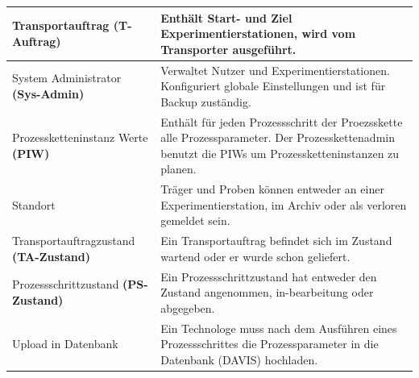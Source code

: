 \documentclass[enabledeprecatedfontcommands,fontsize=12pt,paper=a4,twoside]{scrartcl}
\begin{document}
\begin{longtable}[c]{|p{7cm}|p{8cm}|}
Transportauftrag \textbf{(T-Auftrag)}          & Enthält Start- und Ziel Experimentierstationen, wird vom Transporter ausgeführt.                                                                                                                                                                      \\ \hline
System Administrator \textbf{(Sys-Admin)}      & Verwaltet Nutzer und Experimentierstationen. Konfiguriert globale Einstellungen und ist für Backup zuständig.                                                                                                                                         \\ \hline
Prozessketteninstanz Werte \textbf{(PIW)}      & Enthält für jeden Prozessschritt der Proezsskette alle Prozessparameter. Der Prozesskettenadmin benutzt die PIWs um Prozessketteninstanzen zu planen.                                                                                                 \\ \hline
Standort                                                        & Träger und Proben können entweder an einer Experimentierstation, im Archiv oder als verloren gemeldet sein.                                                                                                                                           \\ \hline
Transportauftragzustand \textbf{(TA-Zustand)}  & Ein Transportauftrag befindet sich im Zustand wartend oder er wurde schon geliefert.                                                                                                                                                                  \\ \hline
Prozessschrittzustand \textbf{(PS-Zustand)}    & Ein Prozessschrittzustand hat entweder den Zustand angenommen, in-bearbeitung oder abgegeben.                                                                                                                                                         \\ \hline
Upload in Datenbank                                             & Ein Technologe muss nach dem Ausführen eines Prozessschrittes die Prozessparameter in die Datenbank (DAVIS) hochladen.                                                                                                                                \\ \hline
\end{longtable}
\end{document}
